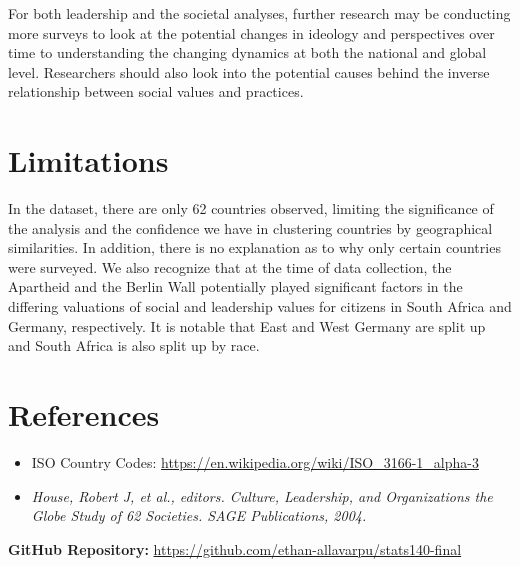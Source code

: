 \documentclass[
]{article}
\providecommand{\tightlist}{%
  \setlength{\itemsep}{0pt}\setlength{\parskip}{0pt}}
\begin{document}
For both leadership and the societal analyses, further research may be
conducting more surveys to look at the potential changes in ideology and
perspectives over time to understanding the changing dynamics at both
the national and global level. Researchers should also look into the
potential causes behind the inverse relationship between social values
and practices.

\hypertarget{limitations}{%
\section{Limitations}\label{limitations}}

In the dataset, there are only 62 countries observed, limiting the
significance of the analysis and the confidence we have in clustering
countries by geographical similarities. In addition, there is no
explanation as to why only certain countries were surveyed. We also
recognize that at the time of data collection, the Apartheid and the
Berlin Wall potentially played significant factors in the differing
valuations of social and leadership values for citizens in South Africa
and Germany, respectively. It is notable that East and West Germany are
split up and South Africa is also split up by race.

\hypertarget{references}{%
\section{References}\label{references}}

\begin{itemize}
\tightlist
\item
  ISO Country Codes:
  \url{https://en.wikipedia.org/wiki/ISO_3166-1_alpha-3}
\item
  \emph{House, Robert J, et al., editors. Culture, Leadership, and Organizations the Globe Study of 62 Societies. SAGE Publications, 2004.}
\end{itemize}

\vfill

\textbf{GitHub Repository:}
\url{https://github.com/ethan-allavarpu/stats140-final}
\end{document}
